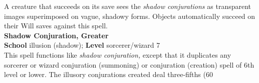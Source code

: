 A creature that succeeds on its save sees the \textit{shadow conjurations }as transparent images superimposed on vague, shadowy forms. Objects automatically succeed on their Will saves against this spell.\\
\textbf{Shadow Conjuration, Greater}\\
\textbf{School} illusion (shadow); \textbf{Level} sorcerer/wizard 7\\
This spell functions like \textit{shadow conjuration, }except that it duplicates any sorcerer or wizard conjuration (summoning) or conjuration (creation) spell of 6th level or lower. The illusory conjurations created deal three-fifths (60%
